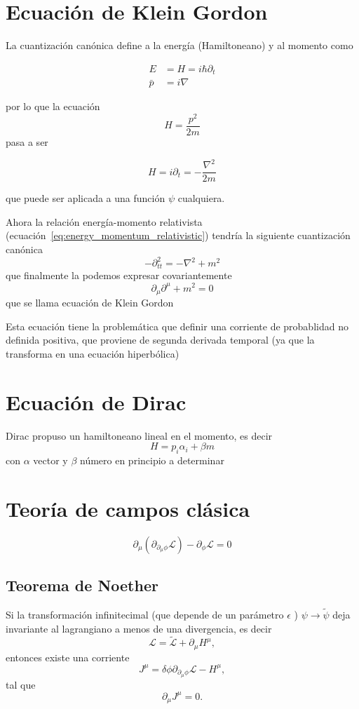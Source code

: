 \documentclass[a4paper]{article}
\newcommand{\Lagr}{\mathcal{L}}
\newcommand{\du}{\partial}
\begin{document}
\section{Ecuación de Klein Gordon}\label{sec:klein-gordon}
La cuantización canónica define a la energía (Hamiltoneano) y al momento como

\[
\begin{aligned}
E &= H = i \hbar \du_t \\
\bar{p} &= i \nabla
\end{aligned}
\]

por lo que la ecuación
\[H = \frac{p^2}{2m}\]
pasa a ser

\begin{equation}
H = i \du_t = - \frac{\nabla^2}{2m}
\label{eq_schrodinger}
\end{equation}

que puede ser aplicada a una función  $\psi$  cualquiera.

 Ahora la relación energía-momento relativista (ecuación~\ref{eq:energy_momentum_relativistic})
tendría la siguiente cuantización canónica
\[
- \du^2_{tt} = - \nabla^2 + m^2
\]
que finalmente la podemos expresar covariantemente
\[
\du_\mu \du^\mu + m^2 = 0
\]
que se llama ecuación de Klein Gordon

 Esta ecuación tiene la problemática que definir una corriente de probablidad no definida positiva, que proviene de segunda derivada temporal (ya que la transforma en una ecuación hiperbólica)

\section{Ecuación de Dirac}\label{sec:dirac}


\noindent Dirac propuso un hamiltoneano lineal en el momento, es decir
\[H = p_i \alpha_i + \beta m\]
con  $\alpha$  vector y  $\beta$ número en principio a determinar


\section{Teoría de campos clásica}\label{ sec:campos}
\begin{equation}
\du_\mu \left(\du_{\du_\mu\phi} \Lagr\right) - \du_{\phi} \Lagr = 0
\label{eq:euler_lagrange}
\end{equation}


\subsection{Teorema de Noether}\label{ sec:noether}
Si la transformación infinitecimal (que depende de un parámetro  $\epsilon$ )  $\psi \to \tilde{\psi}$  deja invariante al lagrangiano a menos de una divergencia, es decir
\[\Lagr = \tilde{\Lagr} + \du_\mu H^\mu,\]
entonces existe una corriente 
\[J^\mu = \delta \phi \du_{\du_\mu \phi} \Lagr - H^\mu,\]
tal que 
\[\du_\mu J^\mu = 0.\]
\end{document}
